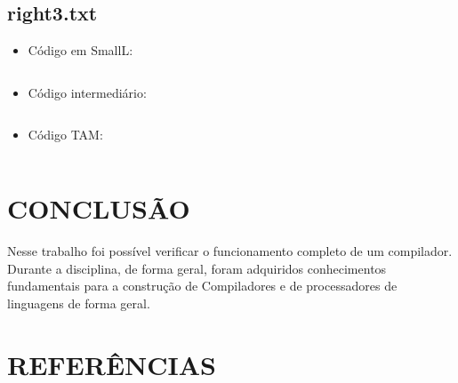 \documentclass[12pt]{article}
\begin{document}
\subsection{right3.txt}

\begin{itemize}
 \item Código em SmallL:\\
 
  \begin{mdframed}[linecolor=black, leftline=false, rightline=false]
    \inputminted[linenos, fontsize=\footnotesize]{text}{../input/right3.txt}
  \end{mdframed}
  
  \mbox{}
 
 \item Código intermediário: \\
 
 \begin{mdframed}[linecolor=black, leftline=false, rightline=false]
    \inputminted[linenos, fontsize=\footnotesize]{text}{right3.out}
  \end{mdframed}

  \mbox{}
  
  \item Código TAM: \\
 
 \begin{mdframed}[linecolor=black, leftline=false, rightline=false]
    \inputminted[linenos, fontsize=\footnotesize]{text}{right3.tam}
  \end{mdframed}
\end{itemize}


\section{CONCLUSÃO}

Nesse trabalho foi possível verificar o funcionamento completo de um compilador. Durante a disciplina, de forma geral,
foram adquiridos conhecimentos fundamentais para a construção de Compiladores e de processadores de linguagens de forma
geral.

\section{REFERÊNCIAS}



\end{document}
